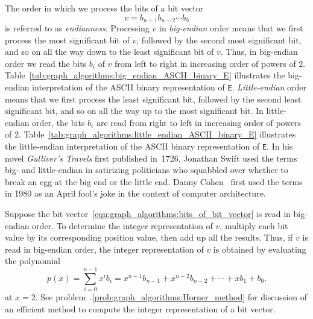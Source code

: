 The order in which we process the bits of a bit vector
\begin{equation}
\label{eqn:graph_algorithms:bits_of_bit_vector}
v
=
b_{n-1} b_{n-2} \cdots b_0
\end{equation}
is referred to as \emph{endianness}. Processing $v$
in \emph{big-endian} order means that we first process
the most significant bit of $v$, followed by the second most
significant bit, and so on all the way down to the least significant
bit of $v$. Thus, in big-endian order we read the bits $b_i$ of $v$
from left to right in increasing order of powers of $2$.
Table~\ref{tab:graph_algorithms:big_endian_ASCII_binary_E} illustrates
the big-endian interpretation of the ASCII binary
representation of \texttt{E}.
\emph{Little-endian} order means that we first
process the least significant bit, followed by the second least
significant bit, and so on all the way up to the most significant
bit. In little-endian order, the bits $b_i$ are read from right to
left in increasing order of powers of $2$.
Table~\ref{tab:graph_algorithms:little_endian_ASCII_binary_E}
illustrates the little-endian interpretation of the ASCII
binary representation of \texttt{E}. In his novel
\emph{Gulliver's Travels} first published
in~1726, Jonathan Swift used the terms
big- and little-endian in
satirizing politicians who squabbled over whether to break an egg at
the big end or the little end. Danny
Cohen~\cite{Cohen1980,Cohen1981} first used the
terms in 1980 as an April fool's joke in the context of computer
architecture.

Suppose the bit vector~\eqref{eqn:graph_algorithms:bits_of_bit_vector}
is read in big-endian order. To determine the integer representation
of $v$, multiply each bit value by its corresponding position value,
then add up all the results. Thus, if $v$ is read in big-endian order,
the integer representation of $v$ is obtained by evaluating the
polynomial
\begin{equation}
\label{eqn:graph_algorithms:big_endian_binary_to_integer}
p(x)
=
\sum_{i=0}^{n-1} x^i b_i
=
x^{n-1} b_{n-1} + x^{n-2} b_{n-2} + \cdots + x b_1 + b_0.
\end{equation}
at $x = 2$. See
problem~\thechapter.\ref{prob:graph_algorithms:Horner_method} for
discussion of an efficient method to compute the integer
representation of a bit vector.

